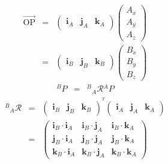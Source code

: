 \documentclass{beamer}
\newcommand{\cdummy}{\cdot}
\newcommand{\tmmathbf}[1]{\ensuremath{\boldsymbol{#1}}}
\newcommand{\tmop}[1]{\ensuremath{\operatorname{#1}}}
\begin{document}
{{\begin{frame}
  \begin{eqnarray*}
    \overrightarrow{\tmop{OP}} & = & \left(\begin{array}{ccc}
      \tmmathbf{i}_A & \tmmathbf{j}_A & \tmmathbf{k}_A
    \end{array}\right) \left(\begin{array}{c}
      A_x\\
      A_y\\
      A_z
    \end{array}\right)\\
    & = & \left(\begin{array}{ccc}
      \tmmathbf{i}_B & \tmmathbf{j}_B & \tmmathbf{k}_B
    \end{array}\right) \left(\begin{array}{c}
      B_x\\
      B_y\\
      B_z
    \end{array}\right)
  \end{eqnarray*}
  \begin{eqnarray*}
    {}^B P & = & {}^B {}_A \mathcal{R} {}^A P
  \end{eqnarray*}
  \begin{eqnarray*}
    {}^B {}_A \mathcal{R} & = & \left(\begin{array}{ccc}
      \tmmathbf{i}_B & \tmmathbf{j}_B & \tmmathbf{k}_B
    \end{array}\right)^{^T} \left(\begin{array}{ccc}
      \tmmathbf{i}_A & \tmmathbf{j}_A & \tmmathbf{k}_A
    \end{array}\right)\\
    & = & \left(\begin{array}{ccc}
      \tmmathbf{i}_B \cdummy \tmmathbf{i}_A & \tmmathbf{i}_B \cdummy
      \tmmathbf{j}_A & \tmmathbf{i}_B \cdummy \tmmathbf{k}_A\\
      \tmmathbf{j}_B \cdummy \tmmathbf{i}_A & \tmmathbf{j}_B \cdummy
      \tmmathbf{j}_A & \tmmathbf{j}_B \cdummy \tmmathbf{k}_A\\
      \tmmathbf{k}_B \cdummy \tmmathbf{i}_A & \tmmathbf{k}_B \cdummy
      \tmmathbf{j}_A & \tmmathbf{k}_B \cdummy \tmmathbf{k}_A
    \end{array}\right)
  \end{eqnarray*}
  
\end{frame}}{\begin{frame}
  \frametitle{}
  

\end{frame}}}
\end{document}
